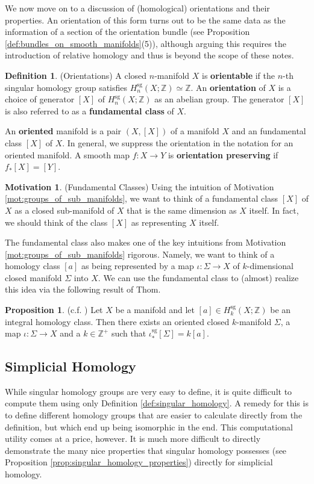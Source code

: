 \documentclass[12pt]{article}
\theoremstyle{definition}
\newtheorem{definition}[theorem]{Definition}
\newtheorem{proposition}[theorem]{Proposition}
\newtheorem{motivation}[theorem]{Motivation}
\numberwithin{equation}{section}
\newcommand{\Z}{{\mathbb Z}}
\newcommand{\op}{\operatorname}
\begin{document}
We now move on to a discussion of (homological) orientations and their properties. An orientation of this form turns out to be the same data as the information of a section of the orientation bundle (see Proposition \ref{def:bundles_on_smooth_manifolds}(5)), although arguing this requires the introduction of relative homology and thus is beyond the scope of these notes.

\begin{definition} (Orientations) A closed $n$-manifold $X$ is {\bf orientable} if the $n$-th singular homology group satisfies $H^{\op{sg}}_n(X;\Z) \simeq \Z$. An {\bf orientation} of $X$ is a choice of generator $[X]$ of $H^{\op{sg}}_n(X;\Z)$ as an abelian group. The generator $[X]$ is also referred to as a {\bf fundamental class} of $X$.

An {\bf oriented} manifold is a pair $(X,[X])$ of a manifold $X$ and an fundamental class $[X]$ of $X$. In general, we suppress the orientation in the notation for an oriented manifold. A smooth map $f:X \to Y$ is {\bf orientation preserving} if $f_*[X] = [Y]$.
\end{definition}

\begin{motivation} (Fundamental Classes) Using the intuition of Motivation \ref{mot:groups_of_sub_manifolds}, we want to think of a fundamental class $[X]$ of $X$ as a closed sub-manifold of $X$ that is the same dimension as $X$ itself. In fact, we should think of the class $[X]$ as representing $X$ itself. 

The fundamental class also makes one of the key intuitions from Motivation \ref{mot:groups_of_sub_manifolds} rigorous. Namely, we want to think of a homology class $[a]$ as being represented by a map $\iota:\Sigma \to X$ of $k$-dimensional closed manifold $\Sigma$ into $X$. We can use the fundamental class to (almost) realize this idea via the following result of Thom.
\end{motivation}

\begin{proposition} (c.f. \cite{sullivan2004}) Let $X$ be a manifold and let $[a] \in H_k^{\op{sg}}(X;\Z)$ be an integral homology class. Then there exists an oriented closed $k$-manifold $\Sigma$, a map $\iota:\Sigma \to X$ and a $k \in \Z^+$ such that $\iota^{\op{sg}}_*[\Sigma] = k[a]$.
\end{proposition}

\subsection{Simplicial Homology} \label{subsec:simplicial_homology} While singular homology groups are very easy to define, it is quite difficult to compute them using only Definition \ref{def:singular_homology}. A remedy for this is to define different homology groups that are easier to calculate directly from the definition, but which end up being isomorphic in the end. This computational utility comes at a price, however. It is much more difficult to directly demonstrate the many nice properties that singular homology possesses (see Proposition \ref{prop:singular_homology_properties}) directly for simplicial homology. 
\end{document}
